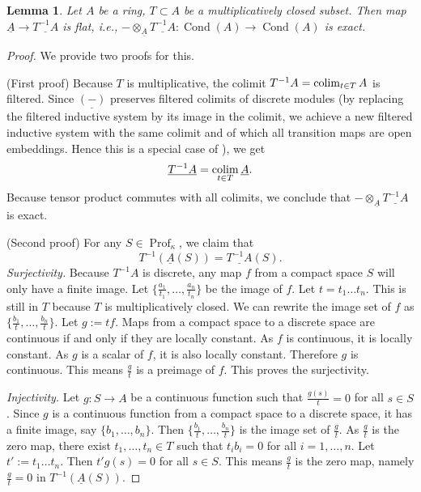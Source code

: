 \documentclass[11pt]{amsart}
\newcommand{\ra}{\rightarrow} %
\newcommand{\Prof}{\operatorname{Prof}}
\newcommand{\colim}{\operatornamewithlimits{\rm{colim}}}
\newcommand{\Cond}{\operatorname{Cond}}
\newcommand{\ul}{\underline}
\theoremstyle{plain}
\newtheorem{lem}[prop]{Lemma}
\theoremstyle{definition}
\numberwithin{equation}{prop}
\begin{document}
\begin{lem}\label{locflat}
Let $A$ be a ring, $T\subset A$ be a multiplicatively closed subset.
Then map $\ul A\ra \ul{T^{-1}A}$ is flat, i.e., $-\otimes_{\ul A} \ul{T^{-1}A}:\Cond(A)\ra \Cond(A)$ is exact.
\end{lem}
\begin{proof}
We provide two proofs for this.

(First proof)
Because $T$ is multiplicative, the colimit $ T^{-1}A = \colim_{t \in T} A $ is filtered.
Since $\ul{(-)}$ preserves filtered colimits of discrete modules (by replacing the filtered inductive system by its image in the colimit, we achieve a new filtered inductive system with the same colimit and of which all transition maps are open embeddings. Hence this is a special case of ), we get
$$\ul{T^{-1}A}=\colim_{t\in T} \ul A.$$
Because tensor product commutes with all colimits, we conclude that $-\otimes_{\ul A} \ul{T^{-1}A}$ is exact.

(Second proof)
For any $S \in \Prof_\kappa$, we claim that
$$T^{-1}(\ul A(S))=\ul{T^{-1}A}(S).$$
\textit{Surjectivity.}
Because  $T^{-1}A$ is discrete, any map $f$ from a compact space $S$ will only have a finite image. 
Let $\{\frac{a_1}{t_1},\dots,\frac{a_n}{t_n}\}$ be the image of $f$.
Let $t=t_1\dots t_n$.
This is still in $T$ because $T$ is multiplicatively closed.
We can rewrite the image set of $f$ as $\{\frac{b_1}{t},\dots,\frac{b_n}{t}\}$.
Let $g:=tf$. 
Maps from a compact space to a discrete space are continuous if and only if they are locally constant.
As $f$ is continuous, it is locally constant.
As $g$ is a scalar of $f$, it is also locally constant. 
Therefore $g$ is continuous.
This means $\frac{g}{t}$ is a preimage of $f$. This proves the surjectivity.

\noindent
\textit{Injectivity.}
Let $g:S\ra A$ be a continuous function such that $\frac{g(s)}{t}=0$ for all $s\in S$. 
Since $g$ is a continuous function from a compact space to a discrete space, it  has a finite image, say $\{b_1,\dots, b_n\}$.
Then $\{\frac{b_1}{t},\dots, \frac{b_n}{t}\}$ is the image set of $\frac{g}{t}$.
As $\frac{g}{t}$ is the zero map, there exist $t_1,\dots,t_n \in T$ such that $t_ib_i=0$ for all $i=1,\dots,n$.
Let $t':=t_1\dots t_n$. Then $t'g(s)=0$ for all $s\in S$.
This means $\frac{g}{t}$ is the zero map, namely $\frac{g}{t}=0$ in $T^{-1}(\ul A(S))$. 
\end{proof}
\end{document}
